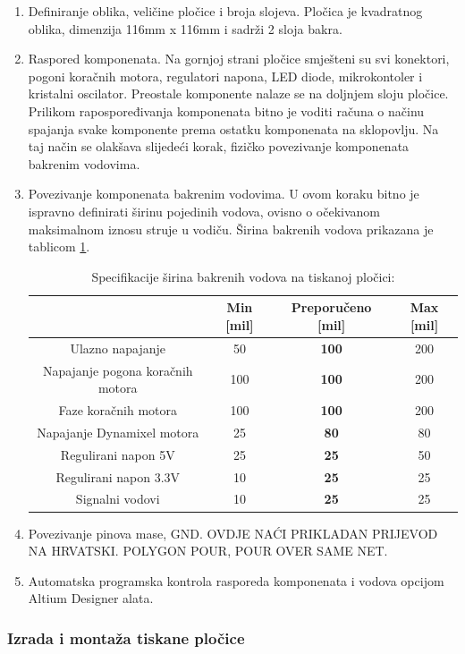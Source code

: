 \documentclass[11pt,a4paper]{article}
\begin{document}
\begin{center}
	\begin{enumerate}
		\item Definiranje oblika, veličine pločice i broja slojeva. Pločica je kvadratnog oblika, dimenzija 116mm x 116mm i sadrži 2 sloja bakra.
		\item Raspored komponenata. Na gornjoj strani pločice smješteni su svi konektori, pogoni koračnih motora, regulatori napona, LED diode, mikrokontoler i kristalni oscilator. Preostale komponente nalaze se na doljnjem sloju pločice. Prilikom rapospoređivanja komponenata bitno je voditi računa o načinu spajanja svake komponente prema ostatku komponenata na sklopovlju. Na taj način se olakšava slijedeći korak, fizičko povezivanje komponenata bakrenim vodovima.
		\item Povezivanje komponenata bakrenim vodovima. U ovom koraku bitno je ispravno definirati širinu pojedinih vodova, ovisno o očekivanom maksimalnom iznosu struje u vodiču. Širina bakrenih vodova prikazana je tablicom \ref{tab:specifikacija_pcb_with}.

\begin{table}[H]
	\centering
	\caption{Specifikacije širina bakrenih vodova na tiskanoj pločici: }
	\label{tab:specifikacija_pcb_with}
	\begin{tabular}{|c|c|c|c|}
			\hline 
		  					& Min [mil] 	& Preporučeno [mil]	& Max [mil] \\ \hline  \hline
		 Ulazno napajanje 	& 50 	& \textbf{100} 			& 200 \\ \hline
		 Napajanje pogona koračnih motora 	& 100 	& \textbf{100} 			& 200 \\ \hline
		 Faze koračnih motora 	& 100 	& \textbf{100} 			& 200 \\ \hline
		 Napajanje Dynamixel motora 	& 25 	& \textbf{80} 			& 80 \\ \hline
		 Regulirani napon 5V 	& 25 	& \textbf{25} 			& 50 \\ \hline
		 Regulirani napon 3.3V 	& 10 	& \textbf{25} 			& 25 \\ \hline
		 Signalni vodovi 	& 10 	& \textbf{25 }			& 25 \\ \hline
	\end{tabular}
\end{table}		

		\item Povezivanje pinova mase, GND. OVDJE NAĆI PRIKLADAN PRIJEVOD NA HRVATSKI. POLYGON POUR, POUR OVER SAME NET.
		\item Automatska programska kontrola rasporeda komponenata i vodova opcijom Altium Designer alata.
	\end{enumerate}
\end{center}


\subsubsection{Izrada i montaža tiskane pločice}
\end{document}
